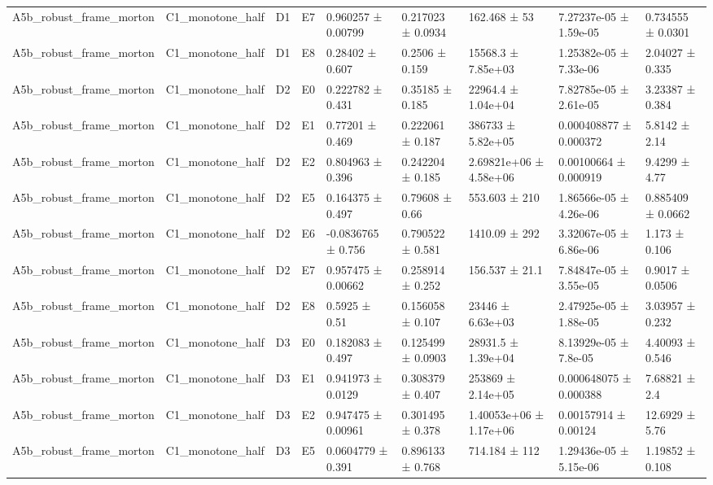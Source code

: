 \begin{table}
\begin{tabular}{lllllllll}
A5b\_robust\_frame\_morton & C1\_monotone\_half & D1 & E7 & 0.960257 ± 0.00799 & 0.217023 ± 0.0934 & 162.468 ± 53 & 7.27237e-05 ± 1.59e-05 & 0.734555 ± 0.0301 \\
A5b\_robust\_frame\_morton & C1\_monotone\_half & D1 & E8 & 0.28402 ± 0.607 & 0.2506 ± 0.159 & 15568.3 ± 7.85e+03 & 1.25382e-05 ± 7.33e-06 & 2.04027 ± 0.335 \\
A5b\_robust\_frame\_morton & C1\_monotone\_half & D2 & E0 & 0.222782 ± 0.431 & 0.35185 ± 0.185 & 22964.4 ± 1.04e+04 & 7.82785e-05 ± 2.61e-05 & 3.23387 ± 0.384 \\
A5b\_robust\_frame\_morton & C1\_monotone\_half & D2 & E1 & 0.77201 ± 0.469 & 0.222061 ± 0.187 & 386733 ± 5.82e+05 & 0.000408877 ± 0.000372 & 5.8142 ± 2.14 \\
A5b\_robust\_frame\_morton & C1\_monotone\_half & D2 & E2 & 0.804963 ± 0.396 & 0.242204 ± 0.185 & 2.69821e+06 ± 4.58e+06 & 0.00100664 ± 0.000919 & 9.4299 ± 4.77 \\
A5b\_robust\_frame\_morton & C1\_monotone\_half & D2 & E5 & 0.164375 ± 0.497 & 0.79608 ± 0.66 & 553.603 ± 210 & 1.86566e-05 ± 4.26e-06 & 0.885409 ± 0.0662 \\
A5b\_robust\_frame\_morton & C1\_monotone\_half & D2 & E6 & -0.0836765 ± 0.756 & 0.790522 ± 0.581 & 1410.09 ± 292 & 3.32067e-05 ± 6.86e-06 & 1.173 ± 0.106 \\
A5b\_robust\_frame\_morton & C1\_monotone\_half & D2 & E7 & 0.957475 ± 0.00662 & 0.258914 ± 0.252 & 156.537 ± 21.1 & 7.84847e-05 ± 3.55e-05 & 0.9017 ± 0.0506 \\
A5b\_robust\_frame\_morton & C1\_monotone\_half & D2 & E8 & 0.5925 ± 0.51 & 0.156058 ± 0.107 & 23446 ± 6.63e+03 & 2.47925e-05 ± 1.88e-05 & 3.03957 ± 0.232 \\
A5b\_robust\_frame\_morton & C1\_monotone\_half & D3 & E0 & 0.182083 ± 0.497 & 0.125499 ± 0.0903 & 28931.5 ± 1.39e+04 & 8.13929e-05 ± 7.8e-05 & 4.40093 ± 0.546 \\
A5b\_robust\_frame\_morton & C1\_monotone\_half & D3 & E1 & 0.941973 ± 0.0129 & 0.308379 ± 0.407 & 253869 ± 2.14e+05 & 0.000648075 ± 0.000388 & 7.68821 ± 2.4 \\
A5b\_robust\_frame\_morton & C1\_monotone\_half & D3 & E2 & 0.947475 ± 0.00961 & 0.301495 ± 0.378 & 1.40053e+06 ± 1.17e+06 & 0.00157914 ± 0.00124 & 12.6929 ± 5.76 \\
A5b\_robust\_frame\_morton & C1\_monotone\_half & D3 & E5 & 0.0604779 ± 0.391 & 0.896133 ± 0.768 & 714.184 ± 112 & 1.29436e-05 ± 5.15e-06 & 1.19852 ± 0.108 \\

\end{tabular}
\end{table}
